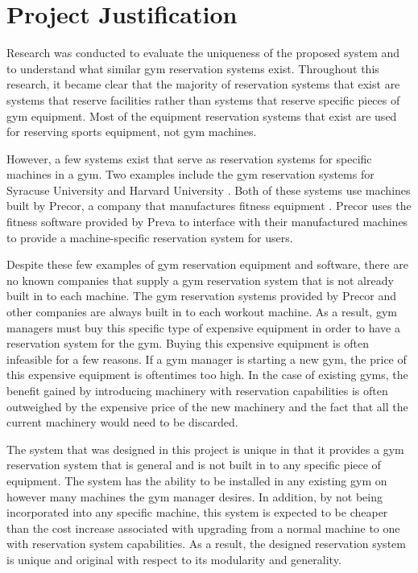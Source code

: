 \documentclass[PPFS.tex]{template/subfiles}
\begin{document}
\section{Project Justification}

Research was conducted to evaluate the uniqueness of the proposed system and to understand what similar gym reservation systems exist. Throughout this research, it became clear that the majority of reservation systems that exist are systems that reserve facilities rather than systems that reserve specific pieces of gym equipment. Most of the equipment reservation systems that exist are used for reserving sports equipment, not gym machines.

However, a few systems exist that serve as reservation systems for specific machines in a gym. Two examples include the gym reservation systems for Syracuse University \cite{Syracuse} and Harvard University \cite{Harvard}. Both of these systems use machines built by Precor, a company that manufactures fitness equipment \cite{Precor}. Precor uses the fitness software provided by Preva \cite{Preva} to interface with their manufactured machines to provide a machine-specific reservation system for users.

Despite these few examples of gym reservation equipment and software, there are no known companies that supply a gym reservation system that is not already built in to each machine. The gym reservation systems provided by Precor and other companies are always built in to each workout machine. As a result, gym managers must buy this specific type of expensive equipment in order to have a reservation system for the gym. Buying this expensive equipment is often infeasible for a few reasons. If a gym manager is starting a new gym, the price of this expensive equipment is oftentimes too high. In the case of existing gyms, the benefit gained by introducing machinery with reservation capabilities is often outweighed by the expensive price of the new machinery and the fact that all the current machinery would need to be discarded.

The system that was designed in this project is unique in that it provides a gym reservation system that is general and is not built in to any specific piece of equipment. The system has the ability to be installed in any existing gym on however many machines the gym manager desires. In addition, by not being incorporated into any specific machine, this system is expected to be cheaper than the cost increase associated with upgrading from a normal machine to one with reservation system capabilities. As a result, the designed reservation system is unique and original with respect to its modularity and generality.
\end{document}
